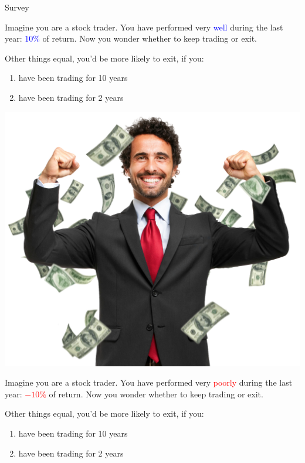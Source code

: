 \documentclass{beamer}
\begin{document}
\begin{frame}[allowframebreaks]{Survey}
	\begin{block}{}
		Imagine you are a stock trader. You have performed very \textcolor{blue}{well} during the last year:
		\textcolor{blue}{$10\%$} of return. Now you wonder whether to keep trading or exit.
	\end{block}

Other things equal, you'd be more likely to exit, if you:

\begin{enumerate}[A]
	\item have been trading for 10 years
	\item have been trading for 2 years
\end{enumerate}

\includegraphics[scale=0.1]{figures/happymoney}

\framebreak

	\begin{block}{}
		Imagine you are a stock trader. You have performed very \textcolor{red}{poorly} during the last year:
		\textcolor{red}{$-10\%$} of return. Now you wonder whether to keep trading or exit.
	\end{block}

	Other things equal, you'd be more likely to exit, if you:

	\begin{enumerate}[A]
		\item have been trading for 10 years
		\item have been trading for 2 years
	\end{enumerate}


\end{frame}
\end{document}
